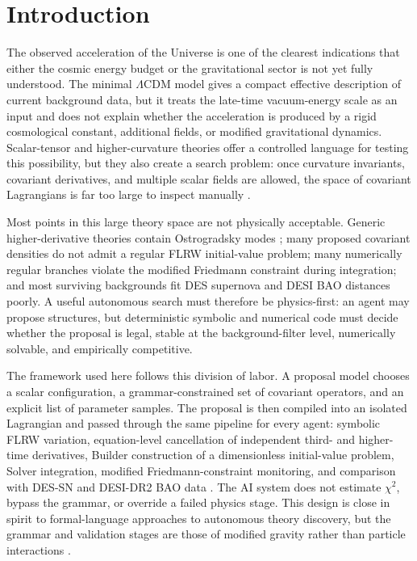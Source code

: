 \documentclass[aps,prd,twocolumn,superscriptaddress,nofootinbib,longbibliography]{revtex4-2}
\begin{document}
\maketitle


\section{Introduction}
\label{sec:introduction}

The observed acceleration of the Universe is one of the clearest indications that either the cosmic energy budget or the gravitational sector is not yet fully understood.  The minimal $\Lambda$CDM model gives a compact effective description of current background data, but it treats the late-time vacuum-energy scale as an input and does not explain whether the acceleration is produced by a rigid cosmological constant, additional fields, or modified gravitational dynamics.  Scalar-tensor and higher-curvature theories offer a controlled language for testing this possibility, but they also create a search problem: once curvature invariants, covariant derivatives, and multiple scalar fields are allowed, the space of covariant Lagrangians is far too large to inspect manually \cite{Clifton2012,SotiriouFaraoni2010,Horndeski1974}.

Most points in this large theory space are not physically acceptable.  Generic higher-derivative theories contain Ostrogradsky modes \cite{Ostrogradsky1850}; many proposed covariant densities do not admit a regular FLRW initial-value problem; many numerically regular branches violate the modified Friedmann constraint during integration; and most surviving backgrounds fit DES supernova and DESI BAO distances poorly.  A useful autonomous search must therefore be physics-first: an agent may propose structures, but deterministic symbolic and numerical code must decide whether the proposal is legal, stable at the background-filter level, numerically solvable, and empirically competitive.

The framework used here follows this division of labor.  A proposal model chooses a scalar configuration, a grammar-constrained set of covariant operators, and an explicit list of parameter samples.  The proposal is then compiled into an isolated Lagrangian and passed through the same pipeline for every agent: symbolic FLRW variation, equation-level cancellation of independent third- and higher-time derivatives, Builder construction of a dimensionless initial-value problem, Solver integration, modified Friedmann-constraint monitoring, and comparison with DES-SN and DESI-DR2 BAO data \cite{DES2024SN,DESI2025BAO}.  The AI system does not estimate $\chi^2$, bypass the grammar, or override a failed physics stage.  This design is close in spirit to formal-language approaches to autonomous theory discovery, but the grammar and validation stages are those of modified gravity rather than particle interactions \cite{Alexander2026Albert}.
\end{document}
